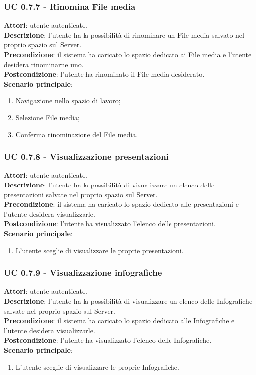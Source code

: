 	\subsubsection{UC 0.7.7 - Rinomina File media}{
		\label{uc0.7.7}
		\textbf{Attori}: utente autenticato.	\\
		\textbf{Descrizione}: l'utente ha la possibilità di rinominare un File media salvato nel proprio spazio sul Server. \\
		\textbf{Precondizione}: il sistema ha caricato lo spazio dedicato ai File media e l'utente desidera rinominarne uno.	\\
		\textbf{Postcondizione}: l'utente ha rinominato il File media desiderato.	\\
		\textbf{Scenario principale}:
		\begin{enumerate}
			\item Navigazione nello spazio di lavoro;
			\item Selezione File media;
			\item Conferma rinominazione del File media.
		\end{enumerate}
		}
	\subsubsection{UC 0.7.8 - Visualizzazione presentazioni}{
		\label{uc0.7.8}
		\textbf{Attori}: utente autenticato.	\\
		\textbf{Descrizione}: l'utente ha la possibilità di visualizzare un elenco delle presentazioni salvate nel proprio spazio sul Server. \\
		\textbf{Precondizione}: il sistema ha caricato lo spazio dedicato alle presentazioni e l'utente desidera visualizzarle.	\\
		\textbf{Postcondizione}: l'utente ha visualizzato l'elenco delle presentazioni.	\\
		\textbf{Scenario principale}:
		\begin{enumerate}
			\item L'utente sceglie di visualizzare le proprie presentazioni.
		\end{enumerate}
		}
	\subsubsection{UC 0.7.9 - Visualizzazione infografiche}{
		\label{uc0.7.9}
		\textbf{Attori}: utente autenticato.	\\
		\textbf{Descrizione}: l'utente ha la possibilità di visualizzare un elenco delle Infografiche salvate nel proprio spazio sul Server. \\
		\textbf{Precondizione}: il sistema ha caricato lo spazio dedicato alle Infografiche e l'utente desidera visualizzarle.	\\
		\textbf{Postcondizione}: l'utente ha visualizzato l'elenco delle Infografiche.	\\
		\textbf{Scenario principale}:
		\begin{enumerate}
			\item L'utente sceglie di visualizzare le proprie Infografiche.
		\end{enumerate}
		}
